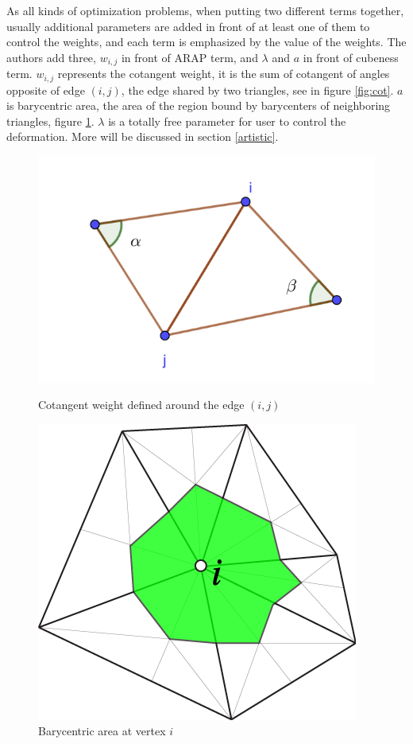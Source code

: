 \documentclass[a4paper,10pt]{article}
\begin{document}
As all kinds of optimization problems, when putting two different terms together, usually additional parameters are added in front of at least one of them to control the weights, and each term is emphasized by the value of the weights. The authors \cite{Liu:CubicStyle:2019} add three, $w_{i,j}$ in front of ARAP term, and $\lambda$ and $a$ in front of cubeness term. $w_{i,j}$ represents the cotangent weight, it is the sum of cotangent of angles opposite of edge $(i,j)$, the edge shared by two triangles, see in figure \ref{fig:cot}. $a$ is barycentric area, the area of the region bound by barycenters of neighboring triangles, figure \ref{fig:bary}. $\lambda$ is a totally free parameter for user to control the deformation. More will be discussed in section \ref{artistic}.
	\begin{figure}[ht!]
		\centering
		\begin{minipage}[t]{.45\textwidth}
			  \centering
			  \includegraphics[width=0.95\linewidth]{figures/cot}
			  \caption{Cotangent weight defined around the edge $(i,j)$}
			  \label{fig:cot}
		\end{minipage}%
		\begin{minipage}[t]{.45\textwidth}
			  \centering
			  \includegraphics[width=0.7\linewidth]{figures/barycentric}
			  \caption{Barycentric area at vertex $i$}
			  \label{fig:bary}
		\end{minipage}
	\end{figure}
\end{document}
